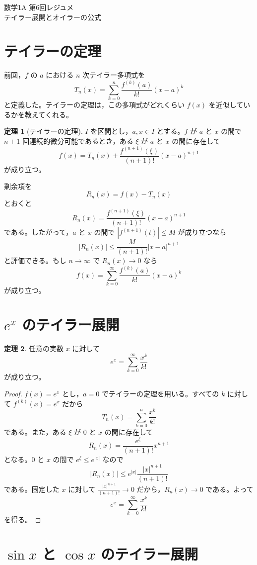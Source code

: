 \documentclass[a4paper,12pt]{jsarticle}
\theoremstyle{definition}
\newtheorem*{theorem}{定理}
\begin{document}
\begin{center}
{\LARGE 数学1A 第6回レジュメ}\\[0.4em]
テイラー展開とオイラーの公式
\end{center}

\section{テイラーの定理}

前回，$f$ の $a$ における $n$ 次テイラー多項式を
\[
T_n(x)=\sum_{k=0}^{n}\frac{f^{(k)}(a)}{k!}(x-a)^k
\]
と定義した。テイラーの定理は，この多項式がどれくらい $f(x)$ を近似しているかを教えてくれる。

\begin{theorem}[テイラーの定理]
$I$ を区間とし，$a,x\in I$ とする。$f$ が $a$ と $x$ の間で $n+1$ 回連続的微分可能であるとき，ある $\xi$ が $a$ と $x$ の間に存在して
\[
f(x)=T_n(x)+\frac{f^{(n+1)}(\xi)}{(n+1)!}(x-a)^{n+1}
\]
が成り立つ。
\end{theorem}

剰余項を
\[
R_n(x)=f(x)-T_n(x)
\]
とおくと
\[
R_n(x)=\frac{f^{(n+1)}(\xi)}{(n+1)!}(x-a)^{n+1}
\]
である。したがって，$a$ と $x$ の間で $|f^{(n+1)}(t)|\leq M$ が成り立つなら
\[
|R_n(x)|\leq \frac{M}{(n+1)!}|x-a|^{n+1}
\]
と評価できる。もし $n\to\infty$ で $R_n(x)\to 0$ なら
\[
f(x)=\sum_{k=0}^{\infty}\frac{f^{(k)}(a)}{k!}(x-a)^k
\]
が成り立つ。

\section{$e^x$ のテイラー展開}

\begin{theorem}
任意の実数 $x$ に対して
\[
e^x=\sum_{k=0}^{\infty}\frac{x^k}{k!}
\]
が成り立つ。
\end{theorem}

\begin{proof}
$f(x)=e^x$ とし，$a=0$ でテイラーの定理を用いる。すべての $k$ に対して $f^{(k)}(x)=e^x$ だから
\[
T_n(x)=\sum_{k=0}^{n}\frac{x^k}{k!}
\]
である。また，ある $\xi$ が $0$ と $x$ の間に存在して
\[
R_n(x)=\frac{e^\xi}{(n+1)!}x^{n+1}
\]
となる。$0$ と $x$ の間で $e^\xi\leq e^{|x|}$ なので
\[
|R_n(x)|\leq e^{|x|}\frac{|x|^{n+1}}{(n+1)!}
\]
である。固定した $x$ に対して $\frac{|x|^{n+1}}{(n+1)!}\to 0$ だから，$R_n(x)\to 0$ である。よって
\[
e^x=\sum_{k=0}^{\infty}\frac{x^k}{k!}
\]
を得る。
\end{proof}

\section{$\sin x$ と $\cos x$ のテイラー展開}
\end{document}
